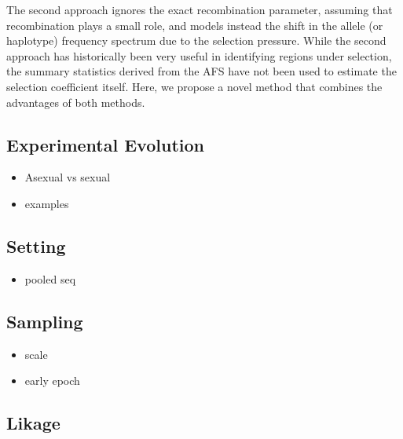 The second approach ignores the exact recombination parameter, assuming
that recombination plays a small role, and models instead the shift in
the allele (or haplotype) frequency spectrum due to the selection
pressure. While the second approach has historically been very useful
in identifying regions under selection, the summary statistics derived
from the AFS have not been used to estimate the selection coefficient
itself. Here, we propose a novel method that combines the advantages
of both methods.

\subsection{Experimental Evolution}
\begin{itemize}
\item Asexual vs sexual
\item examples
\end{itemize}
\subsection{Setting}
\begin{itemize}
\item pooled seq
\end{itemize}
\subsection{Sampling}
\begin{itemize}
\item scale
\item early epoch
\end{itemize}
\subsection{Likage}

